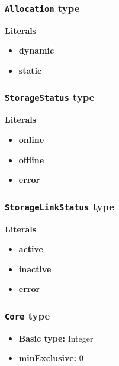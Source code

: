 \subsubsection{\texttt{Allocation} type}

\textbf{Literals}
\begin{itemize}
\item \textbf{dynamic}  
\end{itemize}
\begin{itemize}
\item \textbf{static} 
\end{itemize}

\subsubsection{\texttt{StorageStatus} type}

\textbf{Literals}
\begin{itemize}
\item \textbf{online} 
\end{itemize}
\begin{itemize}
\item \textbf{offline} 
\end{itemize}
\begin{itemize}
\item \textbf{error} 
\end{itemize}

\subsubsection{\texttt{StorageLinkStatus} type}

\textbf{Literals}
\begin{itemize}
\item \textbf{active} 
\end{itemize}
\begin{itemize}
\item \textbf{inactive} 
\end{itemize}
\begin{itemize}
\item \textbf{error} 
\end{itemize}

\subsubsection{\texttt{Core} type}

\begin{itemize}
\item \textbf{Basic type:} Integer
	\item \textbf{minExclusive:} 0
\end{itemize}
